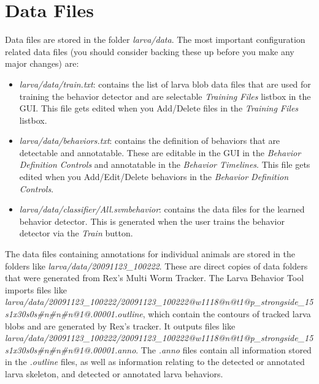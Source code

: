 \documentclass[10pt, onecolumn]{article}
\newcommand{\1}{\textbf{1}}
\begin{document}
\section{Data Files}
\label{sec:data}

Data files are stored in the folder \textit{larva/data}.  The most important configuration related data files (you should consider backing these up before you make any major changes) are:
\begin{itemize}
 \item \textit{larva/data/train.txt}: contains the list of larva blob data files that are used for training the behavior detector and are selectable \textit{Training Files} listbox in the GUI.  This file gets edited when you Add/Delete files in the \textit{Training Files} listbox. 
 \item \textit{larva/data/behaviors.txt}: contains the definition of behaviors that are detectable and annotatable.  These are editable in the GUI in the \textit{Behavior Definition Controls} and annotatable in the \textit{Behavior Timelines}.  This file gets edited when you Add/Edit/Delete behaviors in the \textit{Behavior Definition Controls}.
 \item \textit{larva/data/classifier/All.svmbehavior}: contains the data files for the learned behavior detector.  This is generated when the user trains the behavior detector via the \textit{Train} button.
\end{itemize}

The data files containing annotations for individual animals are stored in the folders like \textit{larva/data/20091123\_100222}.  These are direct copies of data folders that were generated from Rex's Multi Worm Tracker.  The Larva Behavior Tool imports files like\\
\textit{larva/data/20091123\_100222/20091123\_100222@w1118@n@t1@p\_strongside\_15s1x30s0s\#n\#n\#n@1@.00001.outline}, which contain the contours of tracked larva blobs and are generated by Rex's tracker.  It outputs files like\\
\textit{larva/data/20091123\_100222/20091123\_100222@w1118@n@t1@p\_strongside\_15s1x30s0s\#n\#n\#n@1@.00001.anno}.  The \textit{.anno} files contain all information stored in the \textit{.outline} files, as well as information relating to the detected or annotated larva skeleton, and detected or annotated larva behaviors.
\end{document}
